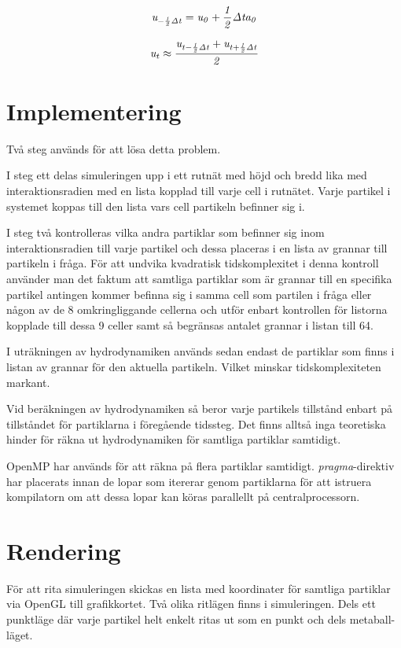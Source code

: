 \documentclass[a4paper,12pt,oneside,final]{extarticle}
\begin{document}
\begin{equation}
{\it u_{-\frac{1}{2} \Delta t} = u_{0} + \frac{1}{2} \Delta t a_0}
\end{equation}

\begin{equation}
{\it u_t \approx \frac{u_{t - \frac{1}{2} \Delta t} + u_{t + \frac{1}{2} \Delta t} }{2} }
\end{equation}

\clearpage
\section{Implementering}
Två steg används för att lösa detta problem.

I steg ett delas simuleringen upp i ett rutnät med höjd och bredd lika med interaktionsradien med en lista kopplad till varje cell i rutnätet.
Varje partikel i systemet koppas till den lista vars cell partikeln befinner sig i.

I steg två kontrolleras vilka andra partiklar som befinner sig inom interaktionsradien till varje partikel och dessa placeras i en lista av grannar till partikeln i fråga.
För att undvika kvadratisk tidskomplexitet i denna kontroll använder man det faktum att samtliga partiklar som är grannar till en specifika partikel antingen kommer befinna sig i samma cell som partilen i fråga eller någon av de 8 omkringliggande cellerna och utför enbart kontrollen för listorna kopplade till dessa 9 celler samt så begränsas antalet grannar i listan till 64.

I uträkningen av hydrodynamiken används sedan endast de partiklar som finns i listan av grannar för den aktuella partikeln.
Vilket minskar tidskomplexiteten markant.

Vid beräkningen av hydrodynamiken så beror varje partikels tillstånd enbart på tillståndet för partiklarna i föregående tidssteg.
Det finns alltså inga teoretiska hinder för räkna ut hydrodynamiken för samtliga partiklar samtidigt.

OpenMP \cite{openmp} har används för att räkna på flera partiklar samtidigt.
\textit{pragma}-direktiv har placerats innan de lopar som itererar genom partiklarna för att istruera kompilatorn om att dessa lopar kan köras parallellt på centralprocessorn.

\section{Rendering}
För att rita simuleringen skickas en lista med koordinater för samtliga partiklar via OpenGL till grafikkortet.
Två olika ritlägen finns i simuleringen.
Dels ett punktläge där varje partikel helt enkelt ritas ut som en punkt och dels metaball-läget.
\end{document}
